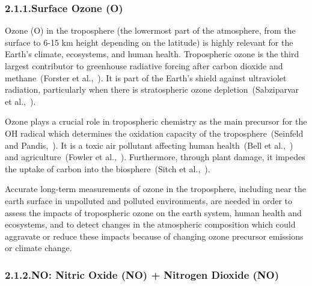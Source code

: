 \documentclass[9pt]{report}
\begin{document}
\subsubsection{2.1.1.\hspace*{0.5em}Surface Ozone (O)}\label{sec-surface-ozone-o3}%

\noindent{}Ozone (O) in the troposphere (the lowermost part of the atmosphere, from the surface to 6-15 km height depending on the latitude) is highly relevant for the Earth’s climate, ecosystems, and human health.
Tropospheric ozone is the third largest contributor to greenhouse radiative forcing after carbon dioxide and methane~(Forster et al.,~).
It is part of the Earth’s shield against ultraviolet radiation, particularly when there is stratospheric ozone depletion~(Sabziparvar et al.,~).%

Ozone plays a crucial role in tropospheric chemistry as the main precursor for the OH radical which determines the oxidation capacity of the troposphere~(Seinfeld and Pandis,~). 
It is a toxic air pollutant affecting human health~(Bell et al.,~) and agriculture~(Fowler et al.,~).
Furthermore, through plant damage, it impedes the uptake of carbon into the biosphere~(Sitch et al.,~).%

Accurate long-term measurements of ozone in the troposphere, including near the earth surface in unpolluted and polluted environments, are needed in order to assess the impacts of tropospheric ozone on the earth system, human health and ecosystems, and to detect changes in the atmospheric composition which could aggravate or reduce these impacts because of changing ozone precursor emissions or climate change.%

\subsubsection{2.1.2.\hspace*{0.5em}NO: Nitric Oxide (NO) + Nitrogen Dioxide (NO)}\label{sec-nox--nitric-oxide-no-nitrogen-dioxide-no2}%
\end{document}
